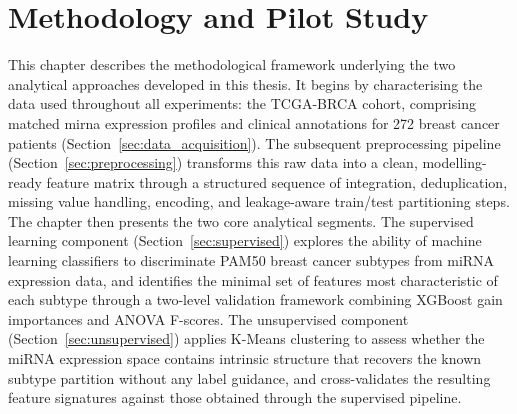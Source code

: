 




\chapter{Methodology and Pilot Study}
\label{ch:pilot}

This chapter describes the methodological framework underlying the two analytical 
approaches developed in this thesis. It begins by characterising the data used 
throughout all experiments: the TCGA-BRCA cohort, comprising matched \gls{mirna} expression 
profiles and clinical annotations for 272 breast cancer patients 
(Section~\ref{sec:data_acquisition}). The subsequent preprocessing pipeline 
(Section~\ref{sec:preprocessing}) transforms this raw data into a clean, 
modelling-ready feature matrix through a structured sequence of integration, 
deduplication, missing value handling, encoding, and leakage-aware train/test 
partitioning steps. The chapter then presents the two core analytical segments. 
The supervised learning component (Section~\ref{sec:supervised}) explores the 
ability of machine learning classifiers to discriminate PAM50 breast cancer 
subtypes from miRNA expression data, and identifies the minimal set of features 
most characteristic of each subtype through a two-level validation framework 
combining XGBoost gain importances and ANOVA F-scores. The unsupervised component 
(Section~\ref{sec:unsupervised}) applies K-Means clustering to assess whether the 
miRNA expression space contains intrinsic structure that recovers the known subtype 
partition without any label guidance, and cross-validates the resulting feature 
signatures against those obtained through the supervised pipeline.

